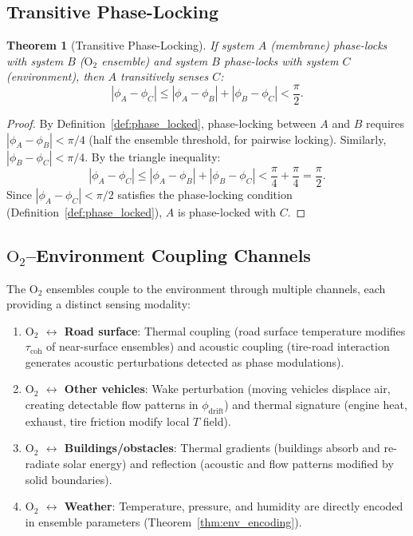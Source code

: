\documentclass[twocolumn,10pt]{article}
\newtheorem{theorem}{Theorem}[section]
\theoremstyle{definition}
\theoremstyle{remark}
\begin{document}
\subsection{Transitive Phase-Locking}

\begin{theorem}[Transitive Phase-Locking]
\label{thm:transitive}
If system $A$ (membrane) phase-locks with system $B$ ($\mathrm{O}_2$ ensemble) and system $B$ phase-locks with system $C$ (environment), then $A$ transitively senses $C$:
\begin{equation}
  |\phi_A - \phi_C| \leq |\phi_A - \phi_B| + |\phi_B - \phi_C| < \frac{\pi}{2}.
  \label{eq:transitive}
\end{equation}
\end{theorem}

\begin{proof}
By Definition~\ref{def:phase_locked}, phase-locking between $A$ and $B$ requires $|\phi_A - \phi_B| < \pi/4$ (half the ensemble threshold, for pairwise locking). Similarly, $|\phi_B - \phi_C| < \pi/4$. By the triangle inequality:
\begin{equation}
  |\phi_A - \phi_C| \leq |\phi_A - \phi_B| + |\phi_B - \phi_C| < \frac{\pi}{4} + \frac{\pi}{4} = \frac{\pi}{2}.
  \label{eq:transitive_proof}
\end{equation}
Since $|\phi_A - \phi_C| < \pi/2$ satisfies the phase-locking condition (Definition~\ref{def:phase_locked}), $A$ is phase-locked with $C$.
\end{proof}

\subsection{$\mathrm{O}_2$--Environment Coupling Channels}

The $\mathrm{O}_2$ ensembles couple to the environment through multiple channels, each providing a distinct sensing modality:

\begin{enumerate}[label=(\roman*)]
  \item \textbf{$\mathrm{O}_2$ $\leftrightarrow$ Road surface}: Thermal coupling (road surface temperature modifies $\tau_{\mathrm{coh}}$ of near-surface ensembles) and acoustic coupling (tire-road interaction generates acoustic perturbations detected as phase modulations).

  \item \textbf{$\mathrm{O}_2$ $\leftrightarrow$ Other vehicles}: Wake perturbation (moving vehicles displace air, creating detectable flow patterns in $\phi_{\mathrm{drift}}$) and thermal signature (engine heat, exhaust, tire friction modify local $T$ field).

  \item \textbf{$\mathrm{O}_2$ $\leftrightarrow$ Buildings/obstacles}: Thermal gradients (buildings absorb and re-radiate solar energy) and reflection (acoustic and flow patterns modified by solid boundaries).

  \item \textbf{$\mathrm{O}_2$ $\leftrightarrow$ Weather}: Temperature, pressure, and humidity are directly encoded in ensemble parameters (Theorem~\ref{thm:env_encoding}).
\end{enumerate}
\end{document}
